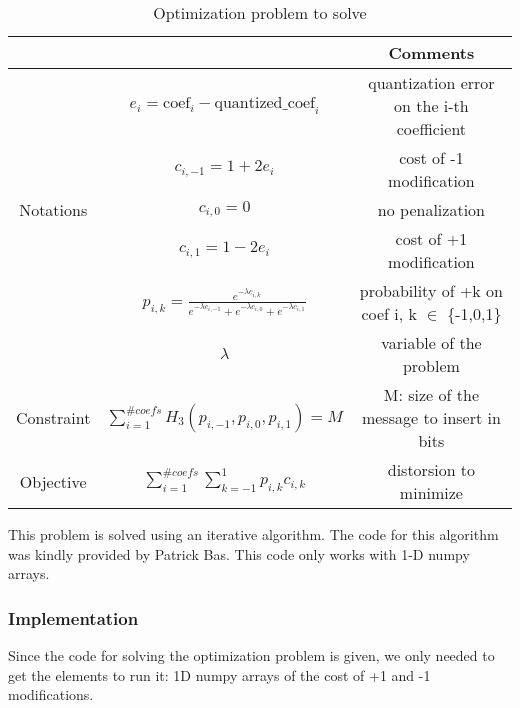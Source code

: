 \documentclass[12pt]{article}
\begin{document}
\begin{table}[H]
\begin{tabular}{ |c|c|c| }
    \hline
    &  & Comments\\
    \hline
    & $e_i = \text{coef}_i - \text{quantized\_coef}_i$ & quantization error on the i-th coefficient\\ 
    & $c_{i,-1} = 1 + 2e_i$ & cost of -1 modification\\ 
    Notations & $c_{i,0} = 0$ & no penalization\\
    & $c_{i,1} = 1 - 2e_i$ & cost of +1 modification\\
    & $p_{i,k} = \frac{e^{-\lambda c_{i,k}}}{e^{-\lambda c_{i,-1}} + e^{-\lambda c_{i,0}} + e^{-\lambda c_{i,1}}}$ & probability of +k on coef i, k $\in$ \{-1,0,1\}\\
    & $\lambda$ & variable of the problem\\
    \hline
    Constraint & $\displaystyle\sum_{i=1}^{\# coefs}{H_3(p_{i,-1},p_{i,0},p_{i,1})} = M$ & M: size of the message to insert in bits\\
    \hline
    Objective & $\displaystyle\sum_{i=1}^{\# coefs}{\sum_{k=-1}^{1}{p_{i,k}c_{i,k}}}$ & distorsion to minimize \\ 
    \hline
\end{tabular}
\caption[Side information]{Optimization problem to solve}
\end{table}

This problem is solved using an iterative algorithm. The code for this algorithm was kindly provided by Patrick Bas. This code only works with 1-D numpy arrays.

\subsubsection{Implementation}
Since the code for solving the optimization problem is given, we only needed to get the elements to run it: 1D numpy arrays of the cost of +1 and -1 modifications.
\end{document}
